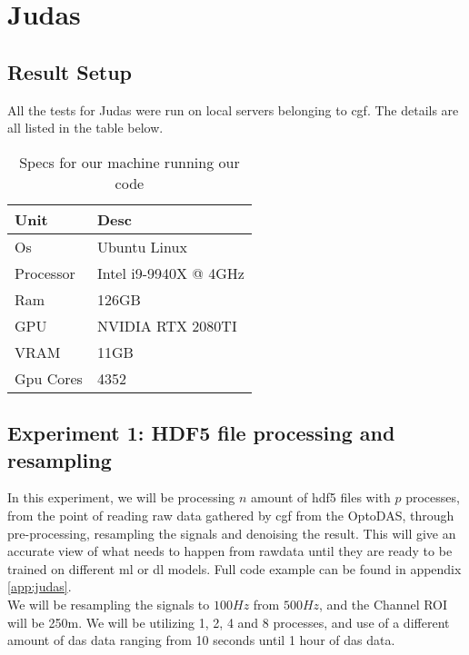 \section{Judas}
\label{res:Judas}

\subsection{Result Setup}

All the tests for Judas were run on local servers belonging to \acrshort{cgf}. The details are all listed in the table below. \\


\begin{table}[!h]
\centering
\begin{tabular}{|l|l|}
\hline
\textbf{Unit} & \textbf{Desc}         \\ \hline
Os            & Ubuntu Linux          \\ \hline
Processor     & Intel i9-9940X @ 4GHz \\ \hline
Ram           & 126GB                 \\ \hline
GPU           & NVIDIA RTX 2080TI     \\ \hline
VRAM          & 11GB                  \\ \hline
Gpu Cores     & 4352                  \\ \hline
\end{tabular}
\label{tab:cgfspecs}
\caption{Specs for our machine running our code}
\end{table}

\subsection{Experiment 1: HDF5 file processing and resampling}

In this experiment, we will be processing $n$ amount of \acrshort{hdf5} files with $p$ processes, from the point of reading raw data gathered by \acrshort{cgf} from the OptoDAS, through pre-processing, resampling the signals and denoising the result. This will give an accurate view of what needs to happen from rawdata until they are ready to be trained on different \acrshort{ml} or \acrshort{dl} models. Full code example can be found in appendix \ref{app:judas}. \\

We will be resampling the signals to $100Hz$ from $500Hz$, and the Channel ROI will be 250m. We will be utilizing 1, 2, 4 and 8 processes, and use of a different amount of \acrshort{das} data ranging from 10 seconds until 1 hour of \acrshort{das} data.



